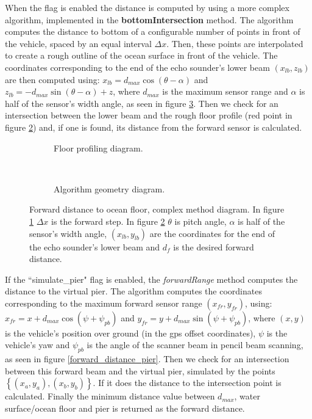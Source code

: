 \documentclass[10pt,a4paper]{article}
\begin{document}
When the flag is enabled the distance is computed by using a more complex algorithm, implemented in the \textbf{bottomIntersection} method. The algorithm computes the distance to bottom of a configurable number of points in front of the vehicle, spaced by an equal interval $\Delta x$. Then, these points are interpolated to create a rough outline of the ocean surface in front of the vehicle. The coordinates corresponding to the end of the echo sounder's lower beam $\left(x_{lb}, z_{lb}\right)$ are then computed using: $x_{lb} = d_{max} \cos\left(\theta - \alpha \right)$ and $z_{lb} = - d_{max} \sin\left(\theta - \alpha \right) + z$, where $d_{max}$ is the maximum sensor range and $\alpha$ is half of the sensor's width angle, as seen in figure \ref{forward_distance_floor_complex}. Then we check for an intersection between the lower beam and the rough floor profile (red point in figure \ref{complex_geometry}) and, if one is found, its distance from the forward sensor is calculated.

\begin{figure}[h]
    \centering
    \begin{subfigure}[b]{0.4\textwidth}
        
        \caption{Floor profiling diagram.}
        \label{complex_profile}
    \end{subfigure}
    ~\hfill%
    \begin{subfigure}[b]{0.4\textwidth}
        
        \caption{Algorithm geometry diagram.}
        \label{complex_geometry}
    \end{subfigure}
    \caption{Forward distance to ocean floor, complex method diagram. In figure \ref{complex_profile} $\Delta x$ is the forward step. In figure \ref{complex_geometry} $\theta$ is pitch angle, $\alpha$ is half of the sensor's width angle, $\left(x_{lb},y_{lb}\right)$ are the coordinates for the end of the echo sounder's lower beam and $d_f$ is the desired forward distance.}
    \label{forward_distance_floor_complex}
\end{figure}

If the ``simulate\_pier" flag is enabled, the \textit{forwardRange} method computes the distance to the virtual pier. The algorithm computes the coordinates corresponding to the maximum forward sensor range $\left(x_{fr}, y_{fr}\right)$, using: $x_{fr} = x + d_{max} \cos\left(\psi + \psi_{pb} \right)$ and $y_{fr} = y + d_{max} \sin\left(\psi + \psi_{pb} \right)$, where $\left(x, y\right)$ is the vehicle's position over ground (in the gps offset coordinates), $\psi$ is the vehicle's yaw and $\psi_{pb}$ is the angle of the scanner beam in pencil beam scanning, as seen in figure \ref{forward_distance_pier}. Then we check for an intersection between this forward beam and the virtual pier, simulated by the points $\left\{\left(x_a,y_a\right), \left(x_b,y_b\right)\right\}$. If it does the distance to the intersection point is calculated. Finally the minimum distance value between $d_{max}$, water surface/ocean floor and pier is returned as the forward distance.
\end{document}
